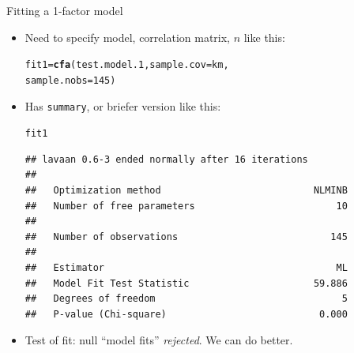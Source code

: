 \documentclass[unknownkeysallowed]{beamer}\usepackage[]{graphicx}\usepackage[]{color}
\makeatletter
\newcommand{\hlnum}[1]{\textcolor[rgb]{0.686,0.059,0.569}{#1}}%
\newcommand{\hlstd}[1]{\textcolor[rgb]{0.345,0.345,0.345}{#1}}%
\newcommand{\hlkwb}[1]{\textcolor[rgb]{0.69,0.353,0.396}{#1}}%
\newcommand{\hlkwc}[1]{\textcolor[rgb]{0.333,0.667,0.333}{#1}}%
\newcommand{\hlkwd}[1]{\textcolor[rgb]{0.737,0.353,0.396}{\textbf{#1}}}%
\newenvironment{kframe}{%
 \def\at@end@of@kframe{}%
 \ifinner\ifhmode%
  \def\at@end@of@kframe{\end{minipage}}%
  \begin{minipage}{\columnwidth}%
 \fi\fi%
 \def\FrameCommand##1{\hskip\@totalleftmargin \hskip-\fboxsep
 \colorbox{shadecolor}{##1}\hskip-\fboxsep
     \hskip-\linewidth \hskip-\@totalleftmargin \hskip\columnwidth}%
 \MakeFramed {\advance\hsize-\width
   \@totalleftmargin\z@ \linewidth\hsize
   \@setminipage}}%
 {\par\unskip\endMakeFramed%
 \at@end@of@kframe}
\newenvironment{knitrout}{}{} %
\makeatother
\begin{document}
\begin{frame}[fragile]{Fitting a 1-factor model}
  
  \begin{itemize}
  \item Need to specify model, correlation matrix, $n$ like this:

\begin{knitrout}
\color{fgcolor}\begin{kframe}
\begin{alltt}
\hlstd{fit1}\hlkwb{=}\hlkwd{cfa}\hlstd{(test.model.1,}\hlkwc{sample.cov}\hlstd{=km,}
    \hlkwc{sample.nobs}\hlstd{=}\hlnum{145}\hlstd{)}
\end{alltt}
\end{kframe}
\end{knitrout}

\item Has \texttt{summary}, or briefer version like this:
  

\begin{knitrout}\scriptsize
{}\color{fgcolor}\begin{kframe}
\begin{alltt}
\hlstd{fit1}
\end{alltt}
\begin{verbatim}
## lavaan 0.6-3 ended normally after 16 iterations
## 
##   Optimization method                           NLMINB
##   Number of free parameters                         10
## 
##   Number of observations                           145
## 
##   Estimator                                         ML
##   Model Fit Test Statistic                      59.886
##   Degrees of freedom                                 5
##   P-value (Chi-square)                           0.000
\end{verbatim}
\end{kframe}
\end{knitrout}
 

\item Test of fit: null ``model fits'' \emph{rejected}. We can do better.
  \end{itemize}
  
\end{frame}
\end{document}
